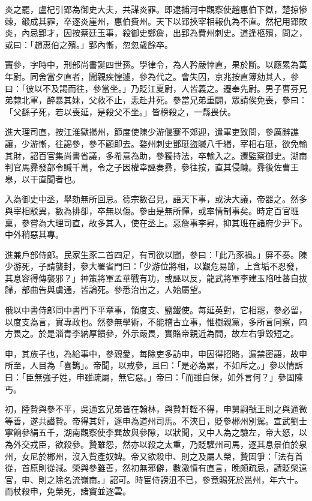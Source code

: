 \begin{pinyinscope}
 炎之罷，盧杞引郢為御史大夫，共謀炎罪。即逮捕河中觀察使趙惠伯下獄，楚掠慘棘，鍛成其罪，卒逐炎崖州，惠伯費州。天下以郢挾宰相報仇為不直。然杞用郢敗炎，內忌郢才，因按蔡廷玉事，殺御史鄭詹，出郢為費州刺史。道逢柩殯，問之，或曰：「趙惠伯之殯。」郢內慚，忽忽歲餘卒。



 竇參，字時中，刑部尚書誕四世孫。學律令，為人矜嚴悻直，果於斷。以廕累為萬年尉。同舍當夕直者，聞親疾惶遽，參為代之。會失囚，京兆按直簿劾其人，參曰：「彼以不及謁而往，參當坐。」乃貶江夏尉，人皆義之。遷奉先尉。男子曹芬兄弟隸北軍，醉暴其妹，父救不止，恚赴井死。參當兄弟重闢，眾請俟免喪，參曰：「父繇子死，若以喪延，是殺父不坐。」皆榜殺之，一縣畏伏。



 進大理司直，按江淮獄揚州，節度使陳少游偃蹇不郊迎，遣軍吏致問，參厲辭譙讓，少游慚，往謁參，參不顧即去。婺州刺史鄧珽盜贓八千緡，宰相右珽，欲免輸其財，詔百官集尚書省議，多希意為助，參獨持法，卒輸入之。遷監察御史。湖南判官馬彞發部令贓千萬，令之子因權幸誣奏彞，參往按，直其侵衊。彞後佐曹王皋，以干直聞者也。



 入為御史中丞，舉劾無所回忌。德宗數召見，語天下事，或決大議，帝器之。然多與宰相駁異，數為排卻，卒無以傷。參由是無所憚，或率情制事矣。時定百官班稟，參嘗為大理司直，故多其入，使在丞上。惡詹事李昇，抑其班在諸府少尹下。中外稍惡其專。



 進兼戶部侍郎。民家生豕二首四足，有司欲以聞，參曰：「此乃豕禍。」屏不奏。陳少游死，子請襲封，參大署省門曰：「少游位將相，以艱危易節，上含垢不忍發，其息容得傳襲邪？」神策將軍孟華戰有功，或誣以反，龍武將軍李建玉陷吐蕃自拔歸，部曲告與虜通，皆論死。參悉治出之，人始屬望。



 俄以中書侍郎同中書門下平章事，領度支、鹽鐵使。每延英對，它相罷，參必留，以度支為言，實專政也。然參無學術，不能稽古立事，惟樹親黨，多所言冋察，四方畏之。於是淄青李納厚饋參，外示嚴畏，實賂帝親近為間，故左右爭毀短之。



 申，其族子也，為給事中，參親愛，每除吏多訪申，申因得招賂，漏禁密語，故申所至，人目為「喜鵲」。帝聞，以戒參，且曰：「是必為累，不如斥之。」參以情訴曰：「臣無強子姓，申雖疏屬，無它惡。」帝曰：「而雖自保，如外言何？」參固陳丐。



 初，陸贄與參不平，吳通玄兄弟皆在翰林，與贄軒輊不得，申舅嗣虢王則之與通微等善，遂共譖贄。帝得其奸，逐申為道州司馬。不浹日，貶參郴州別駕。宣武劉士寧餉參絹五千，湖南觀察使李巽故與參隙，以狀聞，又中人為之驗左，帝大怒，以為外交戎臣，欲殺參。贄雖怨，然亦以殺之太重，乃貶驩州司馬，逐其息景伯於泉州，女尼於郴州，沒入貲產奴婢。帝又欲殺申、則之及屬人榮，贄固爭：「法有首從，首原則從減。榮與參雖善，然初無邪僻，數激憤有直言，晚頗疏忌，請貶榮遠官，申、則之除名流嶺南。」詔可。時宦侍謗沮不已，參竟賜死於邕州，年六十。而杖殺申，免榮死，諸竇並逐雲。




\end{pinyinscope}
